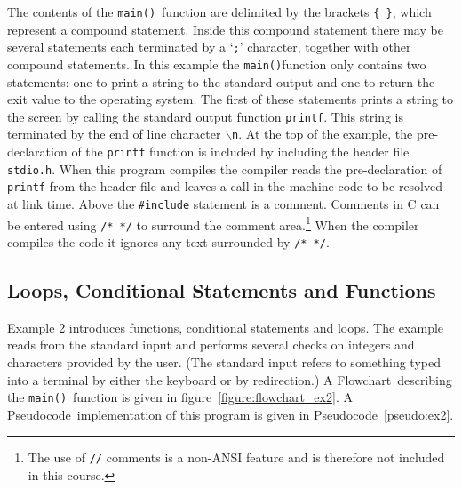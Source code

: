\documentclass[11pt]{scrartcl}
\def\main{\texttt{main()}}
\def\psc{Pseudocode}
\def\flo{Flowchart}
\begin{document}
The contents of the \main\ function are delimited by the brackets
\texttt{\{ \}}, which represent a compound statement.  Inside this
compound statement there may be several statements each terminated by a
`\texttt{;}' character, together with other compound statements.  In
this example the \main function only contains two statements: one to
print a string to the standard output and one to return the exit value to
the operating system.  The first of these statements prints a string
to the screen by calling the standard output function
\texttt{printf}.  This string is terminated by the end of line character \texttt{$\backslash$n}.  At the top of the example, the
pre-declaration of the \texttt{printf} function is included by
including the header file \texttt{stdio.h}.  When this program
compiles the compiler reads the pre-declaration of \texttt{printf}
from the header file and leaves a call in the machine code to be
resolved at link time.  Above the \texttt{\#include} statement is a
comment.  Comments in C can be entered using
\texttt{/* */} to surround the comment area.\footnote{The use of
\texttt{//} comments is a non-ANSI feature and is therefore not
included in this course.}  When the compiler compiles the code it
ignores any text surrounded by \texttt{/* */}.

\clearpage
\newpage

\subsection{Loops, Conditional Statements and Functions}
Example 2 introduces functions, conditional statements and loops.
The example reads from the standard input and performs several
checks on integers and characters provided by the user.  (The standard
input refers to something typed into a terminal by either the keyboard
or by redirection.)  A \flo\ describing the \main\ function is
given in figure~\ref{figure:flowchart_ex2}.  A \psc\
implementation of this program is given in \psc~\ref{pseudo:ex2}.
\end{document}
